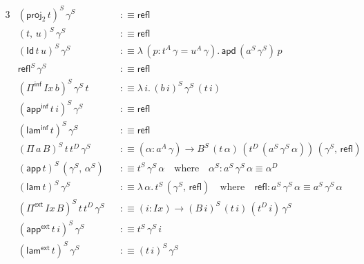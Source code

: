 \documentclass[12pt,a4paper,twoside,openany]{book}
\theoremstyle{remark}
\theoremstyle{definition}
\theoremstyle{theorem}
\newcommand{\mi}[1]{\mathit{#1}}
\newcommand{\ms}[1]{\mathsf{#1}}
\newcommand{\apd}{\ms{apd}}
\newcommand{\refl}{\mathsf{refl}}
\newcommand{\Id}{\mathsf{Id}}
\newcommand{\proj}{\mathsf{proj}}
\newcommand{\Pie}{\Pi^{\mathsf{ext}}}
\newcommand{\appe}{\mathsf{app^{ext}}}
\newcommand{\lame}{\mathsf{lam^{ext}}}
\newcommand{\Piinf}{\Pi^{\mathsf{inf}}}
\newcommand{\appinf}{\mathsf{app^{inf}}}
\newcommand{\laminf}{\mathsf{lam^{inf}}}
\newcommand{\app}{\ms{app}}
\newcommand{\lam}{\ms{lam}}
\newcommand{\defn}{:\equiv}
\begin{document}
\begin{alignat*}{3}
  &(\proj_2\,t)^S\,\gamma^S &&\defn \refl\\
  &(t,\,u)^S\,\gamma^S &&\defn \refl \\
  &(\Id\,t\,u)^S\,\gamma^S &&\defn \lambda\,(p : t^A\,\gamma = u^A\,\gamma).\,\apd\,(a^S\,\gamma^S)\,p\\
  &\refl^S\,\gamma^S &&\defn \refl\\
  &(\Piinf\,\mi{Ix}\,b)^S\,\gamma^S\,t &&\defn \lambda\,i.\,(b\,i)^S\,\gamma^S\,(t\,i)\\
  &(\appinf\,t\,i)^S\,\gamma^S &&\defn \refl \\
  &(\laminf\,t)^S\,\gamma^S &&\defn \refl \\
  &(\Pi\,a\,B)^S\,t\,t^D\,\gamma^S &&\defn (\alpha : a^A\,\gamma) \to B^S\,(t\,\alpha)\,(t^D\,(a^S\,\gamma^S\,\alpha))\,(\gamma^S,\,\refl)\\
  &(\app\,t)^S\,(\gamma^S,\,\alpha^S) &&\defn t^S\,\gamma^S\,\alpha\hspace{1em}\text{where}\hspace{1em} \alpha^S : a^S\,\gamma^S\,\alpha \equiv \alpha^D\\
  &(\lam\,t)^S\,\gamma^S &&\defn \lambda\,\alpha.\,t^S\,(\gamma^S,\,\refl)\hspace{1em}\text{where}\hspace{1em} \refl : a^S\,\gamma^S\,\alpha \equiv a^S\,\gamma^S\,\alpha\\
  &(\Pie\,\mi{Ix}\,B)^S\,t\,t^D\,\gamma^S &&\defn (i : \mi{Ix}) \to (B\,i)^S\,(t\,i)\,(t^D\,i)\,\gamma^S\\
  &(\appe\,t\,i)^S\,\gamma^S &&\defn t^S\,\gamma^S\,i\\
  &(\lame\,t)^S\,\gamma^S &&\defn (t\,i)^S\,\gamma^S
\end{alignat*}

\backmatter

\end{document}
